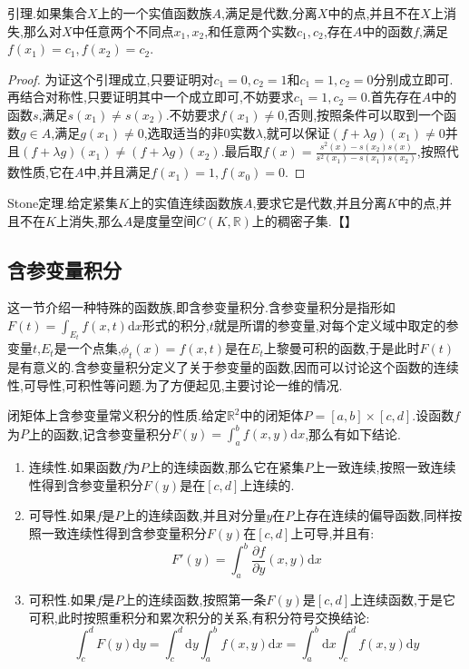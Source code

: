引理.如果集合$X$上的一个实值函数族$A$,满足是代数,分离$X$中的点,并且不在$X$上消失,那么对$X$中任意两个不同点$x_1,x_2$,和任意两个实数$c_1,c_2$,存在$A$中的函数$f$,满足$f(x_1)=c_1,f(x_2)=c_2$.
\begin{proof}
	
	为证这个引理成立,只要证明对$c_1=0,c_2=1$和$c_1=1,c_2=0$分别成立即可.再结合对称性,只要证明其中一个成立即可,不妨要求$c_1=1,c_2=0$.首先存在$A$中的函数$s$,满足$s(x_1)\not=s(x_2)$.不妨要求$f(x_1)\not=0$,否则,按照条件可以取到一个函数$g\in A$,满足$g(x_1)\not=0$,选取适当的非0实数$\lambda$,就可以保证$(f+\lambda g)(x_1)\not=0$并且$(f+\lambda g)(x_1)\not=(f+\lambda g)(x_2)$.最后取$f(x)=\frac{s^2(x)-s(x_2)s(x)}{s^2(x_1)-s(x_1)s(x_2)}$,按照代数性质,它在$A$中,并且满足$f(x_1)=1,f(x_0)=0$.
	
\end{proof}

Stone定理.给定紧集$K$上的实值连续函数族$A$,要求它是代数,并且分离$K$中的点,并且不在$K$上消失,那么$A$是度量空间$C(K,\mathbb{R})$上的稠密子集.【】
\newpage
\subsection{含参变量积分}

这一节介绍一种特殊的函数族,即含参变量积分.含参变量积分是指形如$F(t)=\int_{E_t}f(x,t)\mathrm{d}x$形式的积分,$t$就是所谓的参变量,对每个定义域中取定的参变量$t$,$E_t$是一个点集,$\phi_t(x)=f(x,t)$是在$E_t$上黎曼可积的函数,于是此时$F(t)$是有意义的.含参变量积分定义了关于参变量的函数,因而可以讨论这个函数的连续性,可导性,可积性等问题.为了方便起见,主要讨论一维的情况.

闭矩体上含参变量常义积分的性质.给定$\mathbb{R}^2$中的闭矩体$P=[a,b]\times[c,d]$.设函数$f$为$P$上的函数,记含参变量积分$F(y)=\int_a^bf(x,y)\mathrm{d}x$,那么有如下结论.
\begin{enumerate}
	\item 连续性.如果函数$f$为$P$上的连续函数,那么它在紧集$P$上一致连续,按照一致连续性得到含参变量积分$F(y)$是在$[c,d]$上连续的.
	\item 可导性.如果$f$是$P$上的连续函数,并且对分量$y$在$P$上存在连续的偏导函数,同样按照一致连续性得到含参变量积分$F(y)$在$[c,d]$上可导,并且有:
	$$F'(y)=\int_a^b\frac{\partial f}{\partial y}(x,y)\mathrm{d}x$$
	\item 可积性.如果$f$是$P$上的连续函数,按照第一条$F(y)$是$[c,d]$上连续函数,于是它可积,此时按照重积分和累次积分的关系,有积分符号交换结论:
	$$\int_c^dF(y)\mathrm{d}y=\int_c^d\mathrm{d}y\int_a^bf(x,y)\mathrm{d}x=\int_a^b\mathrm{d}x\int_c^df(x,y)\mathrm{d}y$$
\end{enumerate}


